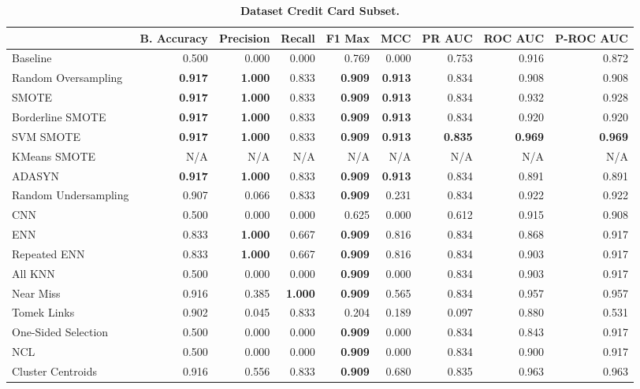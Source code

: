 \begin{table}[H]
    \centering
    \setlength\tabcolsep{2pt}
    \begin{tabularx}{\textwidth}{lRRRRRRRR}
        & B. Accuracy & Precision & Recall & F1 Max & MCC & PR AUC & ROC AUC & P-ROC AUC \\
        \midrule
        Baseline & 0.500 & 0.000 & 0.000 & 0.769 & 0.000 & 0.753 & 0.916 & 0.872 \\
        Random Oversampling & \textbf{0.917} & \textbf{1.000} & 0.833 & \textbf{0.909} & \textbf{0.913} & 0.834 & 0.908 & 0.908 \\
        SMOTE & \textbf{0.917} & \textbf{1.000} & 0.833 & \textbf{0.909} & \textbf{0.913} & 0.834 & 0.932 & 0.928 \\
        Borderline SMOTE & \textbf{0.917} & \textbf{1.000} & 0.833 & \textbf{0.909} & \textbf{0.913} & 0.834 & 0.920 & 0.920 \\
        SVM SMOTE & \textbf{0.917} & \textbf{1.000} & 0.833 & \textbf{0.909} & \textbf{0.913} & \textbf{0.835} & \textbf{0.969} & \textbf{0.969} \\
        KMeans SMOTE & N/A & N/A & N/A & N/A & N/A & N/A & N/A & N/A \\
        ADASYN & \textbf{0.917} & \textbf{1.000} & 0.833 & \textbf{0.909} & \textbf{0.913} & 0.834 & 0.891 & 0.891 \\
        Random Undersampling & 0.907 & 0.066 & 0.833 & \textbf{0.909} & 0.231 & 0.834 & 0.922 & 0.922 \\
        CNN & 0.500 & 0.000 & 0.000 & 0.625 & 0.000 & 0.612 & 0.915 & 0.908 \\
        ENN & 0.833 & \textbf{1.000} & 0.667 & \textbf{0.909} & 0.816 & 0.834 & 0.868 & 0.917 \\
        Repeated ENN & 0.833 & \textbf{1.000} & 0.667 & \textbf{0.909} & 0.816 & 0.834 & 0.903 & 0.917 \\
        All KNN & 0.500 & 0.000 & 0.000 & \textbf{0.909} & 0.000 & 0.834 & 0.903 & 0.917 \\
        Near Miss & 0.916 & 0.385 & \textbf{1.000} & \textbf{0.909} & 0.565 & 0.834 & 0.957 & 0.957 \\
        Tomek Links & 0.902 & 0.045 & 0.833 & 0.204 & 0.189 & 0.097 & 0.880 & 0.531 \\
        One-Sided Selection & 0.500 & 0.000 & 0.000 & \textbf{0.909} & 0.000 & 0.834 & 0.843 & 0.917 \\
        NCL & 0.500 & 0.000 & 0.000 & \textbf{0.909} & 0.000 & 0.834 & 0.900 & 0.917 \\
        Cluster Centroids & 0.916 & 0.556 & 0.833 & \textbf{0.909} & 0.680 & 0.835 & 0.963 & 0.963 \\
    \end{tabularx}
    \vspace{1mm}
    \caption{\textbf{Dataset Credit Card Subset.}}
\end{table}
